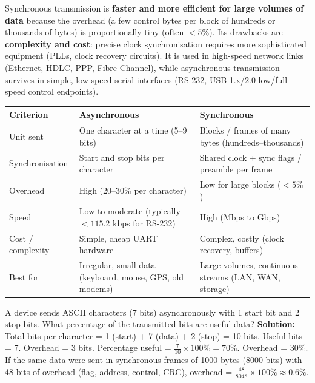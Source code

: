 \documentclass[11pt]{article}
\begin{document}
Synchronous transmission is \textbf{faster and more efficient for large volumes of data} because the overhead (a few control bytes per block of hundreds or thousands of bytes) is proportionally tiny (often $<5\%$). Its drawbacks are \textbf{complexity and cost}: precise clock synchronisation requires more sophisticated equipment (PLLs, clock recovery circuits). It is used in high-speed network links (Ethernet, HDLC, PPP, Fibre Channel), while asynchronous transmission survives in simple, low-speed serial interfaces (RS-232, USB 1.x/2.0 low/full speed control endpoints).

\begin{center}
\begin{tabularx}{\linewidth}{|l|X|X|}
\hline
\rowcolor{popblueL} \textbf{Criterion} & \textbf{Asynchronous} & \textbf{Synchronous} \\
\hline
Unit sent & One character at a time (5--9 bits) & Blocks / frames of many bytes (hundreds--thousands) \\
\hline
Synchronisation & Start and stop bits per character & Shared clock + sync flags / preamble per frame \\
\hline
Overhead & High (20--30\% per character) & Low for large blocks ($<5\%$) \\
\hline
Speed & Low to moderate (typically $<115.2$ kbps for RS-232) & High (Mbps to Gbps) \\
\hline
Cost / complexity & Simple, cheap UART hardware & Complex, costly (clock recovery, buffers) \\
\hline
Best for & Irregular, small data (keyboard, mouse, GPS, old modems) & Large volumes, continuous streams (LAN, WAN, storage) \\
\hline
\end{tabularx}
\end{center}

\begin{exemplebox}
A device sends ASCII characters (7 bits) asynchronously with 1 start bit and 2 stop bits. What percentage of the transmitted bits are useful data?
\textbf{Solution:} Total bits per character = 1 (start) + 7 (data) + 2 (stop) = 10 bits. Useful bits = 7. Overhead = 3 bits. Percentage useful = $\frac{7}{10}\times100\% = 70\%$. Overhead = $30\%$.
If the same data were sent in synchronous frames of 1000 bytes (8000 bits) with 48 bits of overhead (flag, address, control, CRC), overhead = $\frac{48}{8048}\times100\% \approx 0.6\%$.
\end{exemplebox}
\end{document}
